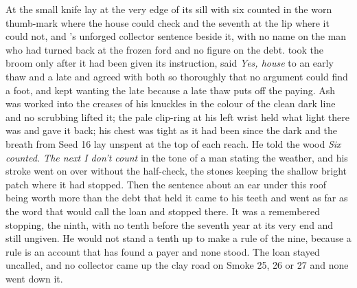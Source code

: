 At  the small knife lay at the very edge of its sill with six counted in the worn thumb-mark where the house could check and the seventh at the lip where it could not, and 's unforged collector sentence beside it, with no name on the man who had turned back at the frozen ford and no figure on the debt.  took the broom only after it had been given its instruction, said \emph{Yes, house} to an early thaw and a late and agreed with both so thoroughly that no argument could find a foot, and kept wanting the late because a late thaw puts off the paying. Ash was worked into the creases of his knuckles in the colour of the clean dark line and no scrubbing lifted it; the pale clip-ring at his left wrist held what light there was and gave it back; his chest was tight as it had been since the dark and the breath from Seed 16 lay unspent at the top of each reach. He told the wood \emph{Six counted. The next I don't count} in the tone of a man stating the weather, and his stroke went on over  without the half-check, the stones keeping the shallow bright patch where it had stopped. Then the sentence about an ear under this roof being worth more than the debt that held it came to his teeth and went as far as the word that would call the loan and stopped there. It was a remembered stopping, the ninth, with no tenth before the seventh year at its very end and still ungiven. He would not stand a tenth up to make a rule of the nine, because a rule is an account that has found a payer and none stood. The loan stayed uncalled, and no collector came up the clay road on Smoke 25, 26 or 27 and none went down it.

